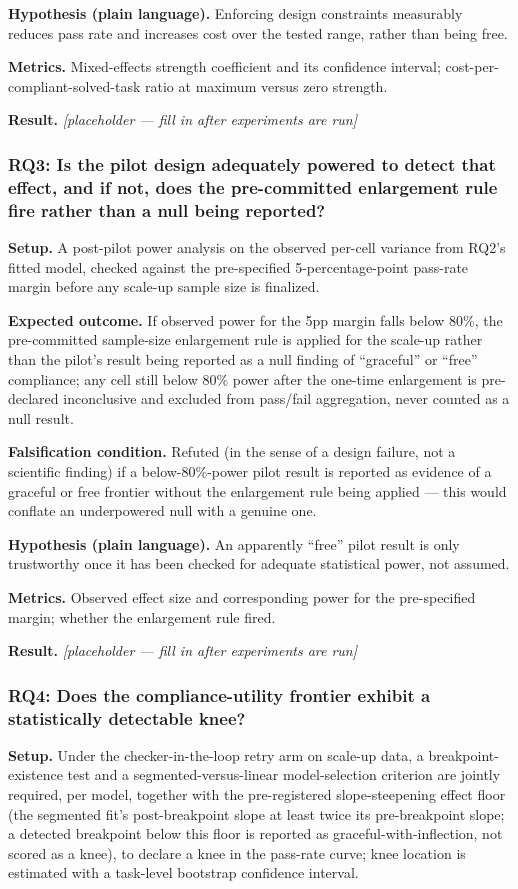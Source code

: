 \documentclass[11pt]{article}
\newcommand{\ph}{\textit{[placeholder --- fill in after experiments are run]}}
\begin{document}
\textbf{Hypothesis (plain language).} Enforcing design constraints measurably reduces pass rate and increases cost over the tested range, rather than being free.

\textbf{Metrics.} Mixed-effects strength coefficient and its confidence interval; cost-per-compliant-solved-task ratio at maximum versus zero strength.

\textbf{Result.} \ph

\subsubsection{RQ3: Is the pilot design adequately powered to detect that effect, and if not, does the pre-committed enlargement rule fire rather than a null being reported?}
\textbf{Setup.} A post-pilot power analysis on the observed per-cell variance from RQ2's fitted model, checked against the pre-specified 5-percentage-point pass-rate margin before any scale-up sample size is finalized.

\textbf{Expected outcome.} If observed power for the 5pp margin falls below 80\%, the pre-committed sample-size enlargement rule is applied for the scale-up rather than the pilot's result being reported as a null finding of ``graceful'' or ``free'' compliance; any cell still below 80\% power after the one-time enlargement is pre-declared inconclusive and excluded from pass/fail aggregation, never counted as a null result.

\textbf{Falsification condition.} Refuted (in the sense of a design failure, not a scientific finding) if a below-80\%-power pilot result is reported as evidence of a graceful or free frontier without the enlargement rule being applied --- this would conflate an underpowered null with a genuine one.

\textbf{Hypothesis (plain language).} An apparently ``free'' pilot result is only trustworthy once it has been checked for adequate statistical power, not assumed.

\textbf{Metrics.} Observed effect size and corresponding power for the pre-specified margin; whether the enlargement rule fired.

\textbf{Result.} \ph

\subsubsection{RQ4: Does the compliance-utility frontier exhibit a statistically detectable knee?}
\textbf{Setup.} Under the checker-in-the-loop retry arm on scale-up data, a breakpoint-existence test and a segmented-versus-linear model-selection criterion are jointly required, per model, together with the pre-registered slope-steepening effect floor (the segmented fit's post-breakpoint slope at least twice its pre-breakpoint slope; a detected breakpoint below this floor is reported as graceful-with-inflection, not scored as a knee), to declare a knee in the pass-rate curve; knee location is estimated with a task-level bootstrap confidence interval.
\end{document}
